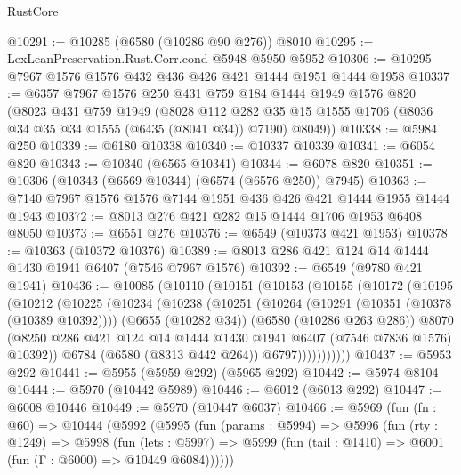 \begin{lexlean}{RustCore}
\begin{coremodule}
{\begin{coremodule}
{{{{{{{{{{{{{{{{{{{{{{{{{{{{{{{{{{{{{{{{{{{{{@10291 := @10285 (@6580 (@10286 @90 @276)) @8010
@10295 := LexLeanPreservation.Rust.Corr.cond @5948 @5950 @5952
@10306 := @10295 @7967 @1576 @1576 @432 @436 @426 @421 @1444 @1951 @1444 @1958
@10337 := @6357
    @7967
    @1576
    @250
    @431
    @759
    @184
    @1444
    @1949
    @1576
    @820
    (@8023
      @431
      @759
      @1949
      (@8028
        @112
        @282
        @35
        @15
        @1555
        @1706
        (@8036 @34 @35 @34 @1555 (@6435 (@8041 @34)) @7190)
        @8049))
@10338 := @5984 @250
@10339 := @6180 @10338
@10340 := @10337 @10339
@10341 := @6054 @820
@10343 := @10340 (@6565 @10341)
@10344 := @6078 @820
@10351 := @10306 (@10343 (@6569 @10344) (@6574 (@6576 @250)) @7945)
@10363 := @7140 @7967 @1576 @1576 @7144 @1951 @436 @426 @421 @1444 @1955 @1444 @1943
@10372 := @8013 @276 @421 @282 @15 @1444 @1706 @1953 @6408 @8050
@10373 := @6551 @276
@10376 := @6549 (@10373 @421 @1953)
@10378 := @10363 (@10372 @10376)
@10389 := @8013 @286 @421 @124 @14 @1444 @1430 @1941 @6407 (@7546 @7967 @1576)
@10392 := @6549 (@9780 @421 @1941)
@10436 := @10085
    (@10110
      (@10151
        (@10153
          (@10155
            (@10172
              (@10195
                (@10212
                  (@10225
                    (@10234
                      (@10238
                        (@10251
                          (@10264
                            (@10291 (@10351 (@10378 (@10389 @10392))))
                            (@6655 (@10282 @34))
                            (@6580 (@10286 @263 @286))
                            @8070
                            (@8250
                              @286
                              @421
                              @124
                              @14
                              @1444
                              @1430
                              @1941
                              @6407
                              (@7546 @7836 @1576)
                              @10392))
                          @6784
                          (@6580 (@8313 @442 @264))
                          @6797)))))))))))
@10437 := @5953 @292
@10441 := @5955 (@5959 @292) (@5965 @292)
@10442 := @5974 @8104
@10444 := @5970 (@10442 @5989)
@10446 := @6012 (@6013 @292)
@10447 := @6008 @10446
@10449 := @5970 (@10447 @6037)
@10466 := @5969
    (fun (fn : @60) =>
    @10444
      (@5992
        (@5995
          (fun (params : @5994) =>
          @5996
            (fun (rty : @1249) =>
            @5998
              (fun (lets : @5997) =>
              @5999 (fun (tail : @1410) => @6001 (fun (Γ : @6000) => @10449 @6084))))))
}}}}}}}}}}}}}}}}}}}}}}}}}}}}}}}}}}}}}}}}}}}}}
\end{coremodule}}
\end{coremodule}
\end{lexlean}
